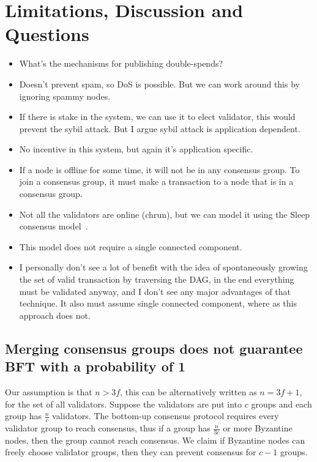 \section{Limitations, Discussion and Questions}
\begin{itemize}
\item What's the mechanisms for publishing double-spends?
\item Doesn't prevent spam, so DoS is possible. But we can work around this by
  ignoring spammy nodes.
\item If there is stake in the system, we can use it to elect validator, this
  would prevent the sybil attack. But I argue sybil attack is application
  dependent.
\item No incentive in this system, but again it's application specific.
\item If a node is offline for some time, it will not be in any consensus group.
  To join a consensus group, it must make a transaction to a node that is in a
  consensus group.
\item Not all the validators are online (chrun), but we can model it using the
  Sleep consensus model~\cite{bentov2016sleepy}.
\item This model does not require a single connected component. 
\item I personally don't see a lot of benefit with the idea of spontaneously
  growing the set of valid transaction by traversing the DAG, in the end
  everything must be validated anyway, and I don't see any major advantages of
  that technique. It also must assume single connected component, where as this
  approach does not.
\end{itemize}

\subsection{Merging consensus groups does not guarantee BFT with a probability
  of 1}
Our assumption is that $n > 3f$, this can be alternatively written as $n = 3f +
1$, for the set of all validators. Suppose the validators are put into $c$
groups and each group has $\frac{n}{c}$ validators. The bottom-up consensus
protocol requires every validator group to reach consensus, thus if a group has
$\frac{n}{3c}$ or more Byzantine nodes, then the group cannot reach consensus.
We claim if Byzantine nodes can freely choose validator groups, then they can
prevent consensus for $c-1$ groups.

